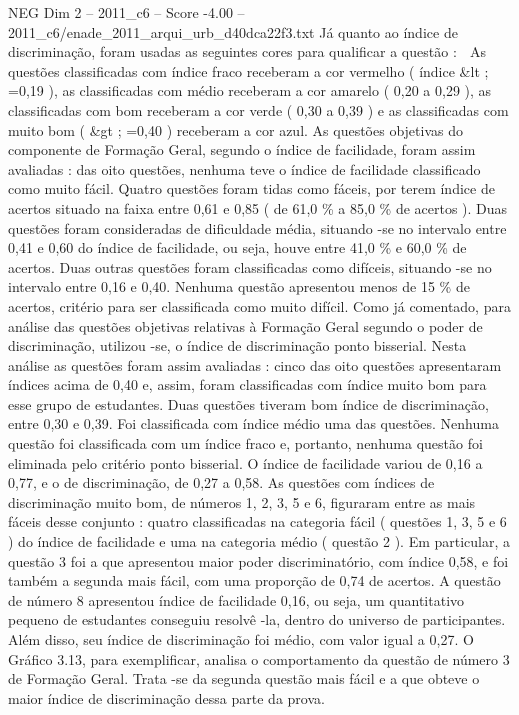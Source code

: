 \begin{textsample}{NEG Dim 2 – 2011\_c6 – Score -4.00 – 2011\_c6/enade\_2011\_arqui\_urb\_d40dca22f3.txt}
Já quanto ao índice de discriminação, foram usadas as seguintes cores para qualificar a questão :  As questões classificadas com índice fraco receberam a cor vermelho ( índice \&lt ; =0,19 ), as classificadas com médio receberam a cor amarelo ( 0,20 a 0,29 ), as classificadas com bom receberam a cor verde ( 0,30 a 0,39 ) e as classificadas com muito bom ( \&gt ; =0,40 ) receberam a cor azul.
As questões objetivas do componente de Formação Geral, segundo o índice de facilidade, foram assim avaliadas : das oito questões, nenhuma teve o índice de facilidade classificado como muito fácil.
Quatro questões foram tidas como fáceis, por terem índice de acertos situado na faixa entre 0,61 e 0,85 ( de 61,0 \% a 85,0 \% de acertos ).
Duas questões foram consideradas de dificuldade média, situando -se no intervalo entre 0,41 e 0,60 do índice de facilidade, ou seja, houve entre 41,0 \% e 60,0 \% de acertos.
Duas outras questões foram classificadas como difíceis, situando -se no intervalo entre 0,16 e 0,40.
Nenhuma questão apresentou menos de 15 \% de acertos, critério para ser classificada como muito difícil.
Como já comentado, para análise das questões objetivas relativas à Formação Geral segundo o poder de discriminação, utilizou -se, o índice de discriminação ponto bisserial.
Nesta análise as questões foram assim avaliadas : cinco das oito questões apresentaram índices acima de 0,40 e, assim, foram classificadas com índice muito bom para esse grupo de estudantes.
Duas questões tiveram bom índice de discriminação, entre 0,30 e 0,39.
Foi classificada com índice médio uma das questões.
Nenhuma questão foi classificada com um índice fraco e, portanto, nenhuma questão foi eliminada pelo critério ponto bisserial.
O índice de facilidade variou de 0,16 a 0,77, e o de discriminação, de 0,27 a 0,58.
As questões com índices de discriminação muito bom, de números 1, 2, 3, 5 e 6, figuraram entre as mais fáceis desse conjunto : quatro classificadas na categoria fácil ( questões 1, 3, 5 e 6 ) do índice de facilidade e uma na categoria médio ( questão 2 ).
Em particular, a questão 3 foi a que apresentou maior poder discriminatório, com índice 0,58, e foi também a segunda mais fácil, com uma proporção de 0,74 de acertos.
A questão de número 8 apresentou índice de facilidade 0,16, ou seja, um quantitativo pequeno de estudantes conseguiu resolvê -la, dentro do universo de participantes.
Além disso, seu índice de discriminação foi médio, com valor igual a 0,27.
O Gráfico 3.13, para exemplificar, analisa o comportamento da questão de número 3 de Formação Geral.
Trata -se da segunda questão mais fácil e a que obteve o maior índice de discriminação dessa parte da prova.

\end{textsample}
